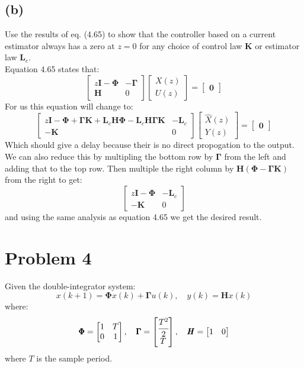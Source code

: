 \documentclass{article}
\begin{document}
\subsection*{(b)}
Use the results of eq. (4.65) to show that the controller based on a current estimator always has a zero at $z=0$ for any choice of control law $\pmb{K}$ or estimator law $\pmb{L}_e$.\\
Equation 4.65 states that:
\[\begin{bmatrix}z\pmb{I}-\pmb{\Phi}&-\pmb{\Gamma}\\\pmb{H}&0\end{bmatrix}\begin{bmatrix}X(z)\\U(z)\end{bmatrix}=\begin{bmatrix}\pmb{0}\end{bmatrix}\]
For us this equation will change to:
\[\begin{bmatrix}z\pmb{I}-\pmb{\Phi}+\pmb{\Gamma}\pmb{K}+\pmb{L}_c\pmb{H}\pmb{\Phi}-\pmb{L}_c\pmb{H}\pmb{\Gamma}\pmb{K}&-\pmb{L}_c\\-\pmb{K}&0\end{bmatrix}\begin{bmatrix}\hat{X}(z)\\Y(z)\end{bmatrix}=\begin{bmatrix}\pmb{0}\end{bmatrix}\]
Which should give a delay because their is no direct propogation to the output. We can also reduce this by multipling the bottom row by $\pmb{\Gamma}$ from the left and adding that to the top row. Then multiple the right column by $\pmb{H}(\pmb{\Phi}-\pmb{\Gamma}\pmb{K})$ from the right to get:
\[\begin{bmatrix}z\pmb{I}-\pmb{\Phi}&-\pmb{L}_c\\-\pmb{K}&0\end{bmatrix}\]
and using the same analysis as equation 4.65 we get the desired result.
\section*{Problem 4}
Given the double-integrator system:\\
\[x(k+1)=\pmb{\Phi}x(k)+\pmb{\Gamma}u(k),\quad y(k)=\pmb{H}x(k)\]
where:
\[\pmb{\Phi}=\begin{bmatrix}1&T\\0&1\end{bmatrix},\quad \pmb{\Gamma}=\begin{bmatrix}\cfrac{T^2}{2}\\T\end{bmatrix},\quad \pmb{H}=\begin{bmatrix}1&0\end{bmatrix}\]
where $T$ is the sample period.
\end{document}
